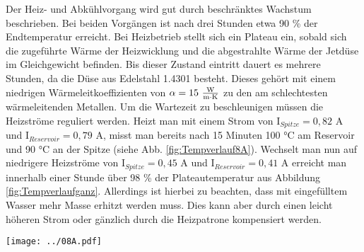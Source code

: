 Der Heiz- und Abkühlvorgang wird gut durch beschränktes Wachstum beschrieben. Bei beiden Vorgängen ist nach drei Stunden etwa 90 \% der Endtemperatur erreicht. Bei Heizbetrieb stellt sich ein Plateau ein, sobald sich die zugeführte Wärme der Heizwicklung und die abgestrahlte Wärme der Jetdüse im Gleichgewicht befinden. Bis dieser Zustand eintritt dauert es mehrere Stunden, da die Düse aus Edelstahl 1.4301 besteht. Dieses gehört mit einem niedrigen Wärmeleitkoeffizienten von $\alpha = 15\ \frac{\textmd{W}}{\textmd{m}\cdot \textmd{K}}$ zu den am schlechtesten wärmeleitenden Metallen. Um die Wartezeit zu beschleunigen müssen die Heizströme reguliert werden. Heizt man mit einem Strom von I$_{Spitze} = 0,82$ A und I$_{Reservoir} = 0,79$ A, misst man bereits nach 15 Minuten 100 °C am Reservoir und 90 °C an der Spitze (siehe Abb. \ref{fig:Tempverlauf8A}). Wechselt man nun auf niedrigere Heizströme von I$_{Spitze} = 0,45$ A und I$_{Reservoir} = 0,41$ A erreicht man innerhalb einer Stunde über 98 \% der Plateautemperatur aus Abbildung \ref{fig:Tempverlaufganz}. Allerdings ist hierbei zu beachten, dass mit eingefülltem Wasser mehr Masse erhitzt werden muss. Dies kann aber durch einen leicht höheren Strom oder gänzlich durch die Heizpatrone kompensiert werden.

\begin{center}
\begin{minipage}{\linewidth}
\centering
\texttt{[image: ../08A.pdf]}%
 \label{fig:Tempverlauf8A}
\end{minipage} 
\end{center} 


